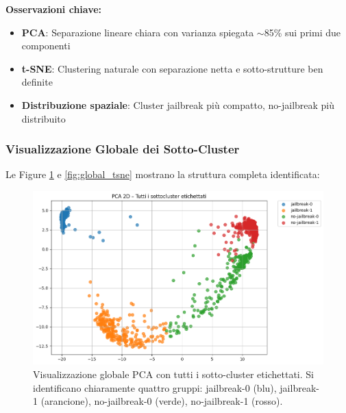 \documentclass[12pt,a4paper]{article}
\begin{document}
\textbf{Osservazioni chiave:}
\begin{itemize}
    \item \textbf{PCA}: Separazione lineare chiara con varianza spiegata $\sim$85\% sui primi due componenti
    \item \textbf{t-SNE}: Clustering naturale con separazione netta e sotto-strutture ben definite
    \item \textbf{Distribuzione spaziale}: Cluster jailbreak più compatto, no-jailbreak più distribuito
\end{itemize}

\subsubsection{Visualizzazione Globale dei Sotto-Cluster}

Le Figure \ref{fig:global_pca} e \ref{fig:global_tsne} mostrano la struttura completa identificata:

\begin{figure}[H]
    \centering
    \includegraphics[width=\textwidth]{pcadiv.png}
    \caption{Visualizzazione globale PCA con tutti i sotto-cluster etichettati. Si identificano chiaramente quattro gruppi: jailbreak-0 (blu), jailbreak-1 (arancione), no-jailbreak-0 (verde), no-jailbreak-1 (rosso).}
    \label{fig:global_pca}
\end{figure}
\end{document}
